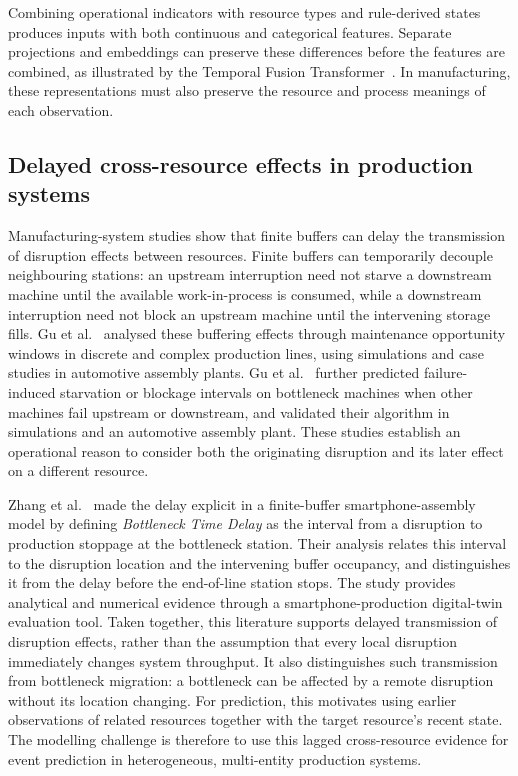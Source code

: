 \documentclass[a4paper,fleqn]{cas-dc}
\begin{document}
Combining operational indicators with resource types and rule-derived states produces inputs with both continuous and categorical features. Separate projections and embeddings can preserve these differences before the features are combined, as illustrated by the Temporal Fusion Transformer~\cite{lim2021tft}. In manufacturing, these representations must also preserve the resource and process meanings of each observation.

\subsection{Delayed cross-resource effects in production systems}\label{sec:manufacturing-delay}

Manufacturing-system studies show that finite buffers can delay the transmission of disruption effects between resources. Finite buffers can temporarily decouple neighbouring stations: an upstream interruption need not starve a downstream machine until the available work-in-process is consumed, while a downstream interruption need not block an upstream machine until the intervening storage fills. Gu et al.~\cite{gu2013hidden} analysed these buffering effects through maintenance opportunity windows in discrete and complex production lines, using simulations and case studies in automotive assembly plants. Gu et al.~\cite{gu2015passive} further predicted failure-induced starvation or blockage intervals on bottleneck machines when other machines fail upstream or downstream, and validated their algorithm in simulations and an automotive assembly plant. These studies establish an operational reason to consider both the originating disruption and its later effect on a different resource.

Zhang et al.~\cite{zhang2022vulnerability} made the delay explicit in a finite-buffer smartphone-assembly model by defining \emph{Bottleneck Time Delay} as the interval from a disruption to production stoppage at the bottleneck station. Their analysis relates this interval to the disruption location and the intervening buffer occupancy, and distinguishes it from the delay before the end-of-line station stops. The study provides analytical and numerical evidence through a smartphone-production digital-twin evaluation tool. Taken together, this literature supports delayed transmission of disruption effects, rather than the assumption that every local disruption immediately changes system throughput. It also distinguishes such transmission from bottleneck migration: a bottleneck can be affected by a remote disruption without its location changing. For prediction, this motivates using earlier observations of related resources together with the target resource's recent state. The modelling challenge is therefore to use this lagged cross-resource evidence for event prediction in heterogeneous, multi-entity production systems.
\end{document}
